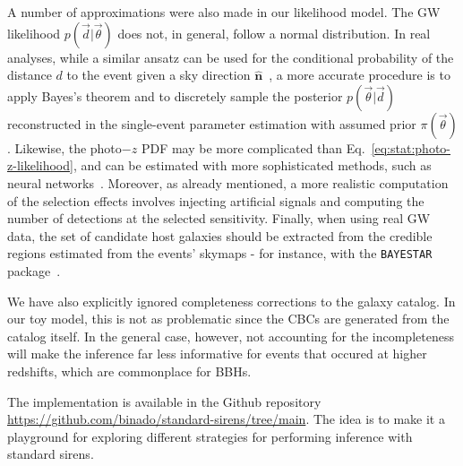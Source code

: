 \documentclass[%
preprint,
nofootinbib,
 amsmath,amssymb,
 aps,
]{revtex4-2}
\newcommand{\given}[2]{p( #1 | #2 )}
\begin{document}
A number of approximations were also made in our likelihood model. The GW likelihood
$\given{\vec{d}}{\vec{\theta}}$ does not, in general, follow a normal distribution. In real
analyses, while a similar ansatz can be used for the conditional probability of the distance $d$ to
the event given a sky direction $\mathbf{\hat{n}}$~\cite{Singer_2016}, a more accurate procedure is
to apply Bayes's theorem and to discretely sample the posterior $\given{\vec{\theta}}{\vec{d}}$
reconstructed in the single-event parameter estimation with assumed prior $\pi (\vec{\theta})$.
Likewise, the photo$-z$ PDF may be more complicated than Eq.~\eqref{eq:stat:photo-z-likelihood},
and can be estimated with more sophisticated methods, such as neural
networks~\cite{Palmese_2023,alfradique2023dark}. Moreover, as already mentioned, a more realistic
computation of the selection effects involves injecting artificial signals and computing the number
of detections at the selected sensitivity. Finally, when using real GW data, the set of candidate
host galaxies should be extracted from the credible regions estimated from the events' skymaps -
for instance, with the \texttt{BAYESTAR} package~\cite{PhysRevD.93.024013}.

We have also explicitly ignored completeness corrections to the galaxy catalog. In our toy model,
this is not as problematic since the CBCs are generated from the catalog itself. In the general
case, however, not accounting for the incompleteness will make the inference far less informative
for events that occured at higher redshifts, which are commonplace for BBHs.

The implementation is available in the Github repository
\url{https://github.com/binado/standard-sirens/tree/main}. The idea is to make it a playground for
exploring different strategies for performing inference with standard sirens.

\end{document}
